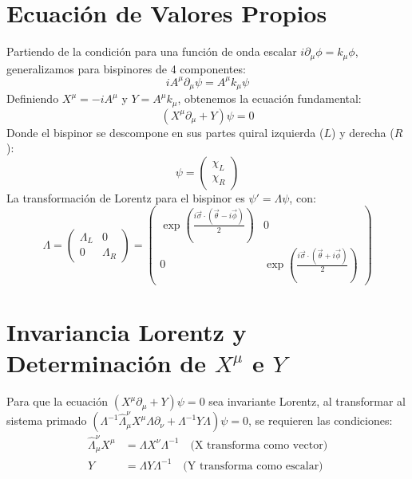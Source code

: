 \section{Ecuación de Valores Propios}

Partiendo de la condición para una función de onda escalar $i\partial_\mu \phi = k_\mu \phi$, generalizamos para bispinores de 4 componentes:
\begin{equation}
    i A^\mu \partial_\mu \psi = A^\mu k_\mu \psi
\end{equation}
Definiendo $X^\mu = -i A^\mu$ y $Y = A^\mu k_\mu$, obtenemos la ecuación fundamental:
\begin{equation}
    (X^\mu \partial_\mu + Y)\psi = 0
\end{equation}
Donde el bispinor se descompone en sus partes quiral izquierda ($L$) y derecha ($R$):
\begin{equation}
    \psi = \begin{pmatrix} \chi_L \\ \chi_R \end{pmatrix}
\end{equation}
La transformación de Lorentz para el bispinor es $\psi' = \Lambda \psi$, con:
\begin{equation}
    \Lambda = \begin{pmatrix} \Lambda_L & 0 \\ 0 & \Lambda_R \end{pmatrix} = \begin{pmatrix} \exp\left(\frac{i\vec{\sigma}\cdot(\vec{\theta}-i\vec{\phi})}{2}\right) & 0 \\ 0 & \exp\left(\frac{i\vec{\sigma}\cdot(\vec{\theta}+i\vec{\phi})}{2}\right) \end{pmatrix}
\end{equation}

\section{Invariancia Lorentz y Determinación de $X^\mu$ e $Y$}

Para que la ecuación $(X^\mu \partial_\mu + Y)\psi = 0$ sea invariante Lorentz, al transformar al sistema primado $(\Lambda^{-1} \hat{\Lambda}^\nu_\mu X^\mu \Lambda \partial_\nu + \Lambda^{-1} Y \Lambda)\psi = 0$, se requieren las condiciones:
\begin{align}
    \hat{\Lambda}^\nu_\mu X^\mu &= \Lambda X^\nu \Lambda^{-1} \quad \text{(X transforma como vector)} \\
    Y &= \Lambda Y \Lambda^{-1} \quad \text{(Y transforma como escalar)}
\end{align}

